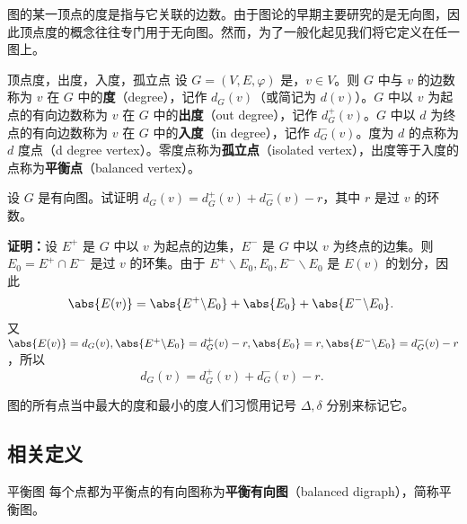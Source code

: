 

\cite{graph2}图的某一顶点的度是指与它关联的边数。由于图论的早期主要研究的是无向图，因此顶点度的概念往往专门用于无向图。然而，为了一般化起见我们将它定义在任一图上。

\begin{definition}{顶点度，出度，入度，孤立点}\label{def_DGraph_1}
设 $G=(V,E,\varphi)$ 是，$v\in V$。则 $G$ 中与 $v$ 的边数称为 $v$ 在 $G$ 中的\textbf{度}（degree），记作 $d_G(v)$（或简记为 $d(v)$）。$G$ 中以 $v$ 为起点的有向边数称为 $v$ 在 $G$ 中的\textbf{出度}（out degree），记作 $d_G^+(v)$。$G$ 中以 $d$ 为终点的有向边数称为 $v$ 在 $G$ 中的\textbf{入度}（in degree），记作 $d_G^-(v)$。度为 $d$ 的点称为 $d$ 度点（d degree vertex）。零度点称为\textbf{孤立点}（isolated vertex），出度等于入度的点称为\textbf{平衡点}（balanced vertex）。
\end{definition}

\begin{example}{}
设 $G$ 是有向图。试证明 $d_G(v)=d_G^+(v)+d_G^-(v)-r$，其中 $r$ 是过 $v$ 的环数。

\textbf{证明：}设 $E^+$ 是 $G$ 中以 $v$ 为起点的边集，$E^-$ 是 $G$ 中以 $v$ 为终点的边集。则 $E_0=E^+\cap E^-$ 是过 $v$ 的环集。由于
$E^+\backslash E_0, E_0, E^-\backslash E_0$ 是 $E(v)$ 的划分，因此
\begin{equation}
\abs{E(v)}=\abs{E^+\backslash E_0}+\abs{E_0}+\abs{E^-\backslash E_0}.~
\end{equation}
又 $\abs{E(v)}=d_G(v),\abs{E^+\backslash E_0}=d_G^+(v)-r, \abs{E_0}=r, \abs{E^-\backslash E_0}=d_G^-(v)-r$，所以
\begin{equation}
d_G(v)=d_G^+(v)+d_G^-(v)-r.~
\end{equation}
\end{example}
图的所有点当中最大的度和最小的度人们习惯用记号 $\Delta,\delta$ 分别来标记它。
\subsection{相关定义}

\begin{definition}{平衡图}\label{def_DGraph_2}
每个点都为平衡点的有向图称为\textbf{平衡有向图}（balanced digraph），简称平衡图。
\end{definition}

